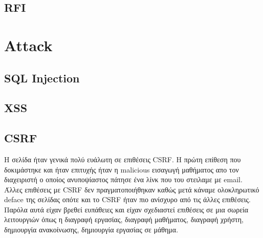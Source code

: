 \documentclass{article}
\begin{document}
\subsection*{\textlatin{RFI}}


\section*{\textlatin{Attack}}
\subsection*{\textlatin{SQL Injection}}



\subsection*{\textlatin{XSS}}

\subsection*{\textlatin{CSRF}}
Η σελίδα ήταν γενικά πολύ ευάλωτη σε επιθέσεις \textlatin{CSRF}. Η πρώτη 
επίθεση που δοκιμάστηκε και ήταν επιτυχής ήταν η \textlatin{malicious} εισαγωγή 
μαθήματος απο τον διαχειριστή ο οποίος ανυποψίαστος πάτησε ένα λίνκ που του στειλαμε με 
\textlatin{email}. Άλλες επιθέσεις με \textlatin{CSRF} δεν πραγματοποιήθηκαν καθώς μετά 
κάναμε ολοκληρωτικό \textlatin{deface} της σελίδας οπότε και το \textlatin{CSRF} ήταν πιο 
ανίσχυρο από τις άλλες επιθέσεις. Παρόλα αυτά είχαν βρεθεί ευπάθειες και είχαν σχεδιαστεί 
επιθέσεις σε μια σωρεία λειτουργιών όπως η διαγραφή εργασίας, διαγραφή μαθήματος, διαγραφή 
χρήστη, δημιουργία ανακοίνωσης, δημιουργία εργασίας σε μάθημα.
\end{document}
